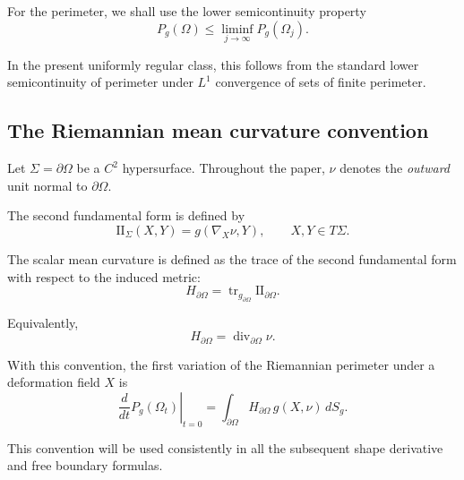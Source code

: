 \documentclass{article}
\renewcommand{\boxed}[1]{#1}
\begin{document}
For the perimeter, we shall use the lower semicontinuity property
\begin{equation}
\boxed{
P_g(\Omega)
\leq
\liminf_{j\to\infty}P_g(\Omega_j).
}
\label{eq:perimeter-lsc}
\end{equation}

In the present uniformly regular class, this follows from the
standard lower semicontinuity of perimeter under $L^1$ convergence of
sets of finite perimeter.

\subsection{The Riemannian mean curvature convention}
\label{subsec:mean-curvature}

Let $\Sigma=\partial\Omega$ be a $C^2$ hypersurface. Throughout the
paper, $\nu$ denotes the \emph{outward} unit normal to $\partial\Omega$.

The second fundamental form is defined by
\begin{equation}
\mathrm{II}_\Sigma(X,Y)
=
g(\nabla_X\nu,Y),
\qquad
X,Y\in T\Sigma.
\label{eq:second-fundamental-form}
\end{equation}

The scalar mean curvature is defined as the trace of the second
fundamental form with respect to the induced metric:
\begin{equation}
\boxed{
H_{\partial\Omega}
=
\operatorname{tr}_{g_{\partial\Omega}}
\mathrm{II}_{\partial\Omega}.
}
\label{eq:mean-curvature-definition}
\end{equation}

Equivalently,
\begin{equation}
\boxed{
H_{\partial\Omega}
=
\operatorname{div}_{\partial\Omega}\nu.
}
\label{eq:mean-curvature-div}
\end{equation}

With this convention, the first variation of the Riemannian
perimeter under a deformation field $X$ is
\begin{equation}
\left.
\frac{d}{dt}
P_g(\Omega_t)
\right|_{t=0}
=
\int_{\partial\Omega}
H_{\partial\Omega}
\,g(X,\nu)\,dS_g.
\label{eq:first-variation-perimeter}
\end{equation}

This convention will be used consistently in all the subsequent
shape derivative and free boundary formulas.
\end{document}
